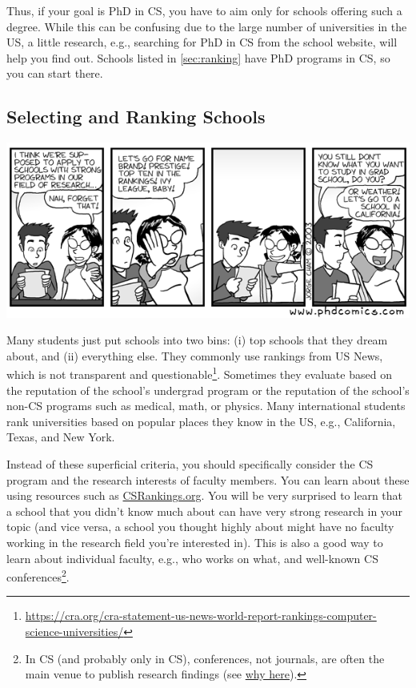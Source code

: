 \documentclass[oneside,11pt,dvipsnames]{book}
\begin{document}
Thus, if your goal is PhD in CS, you have to aim only for schools offering such a degree.  %
While this can be confusing due to the large number of universities in the US, a little research, e.g., searching for PhD in CS from the school website, will help you find out. Schools listed in \autoref{sec:ranking} have PhD programs in CS, so you can start there.


\subsection{Selecting and Ranking Schools}\label{sec:selecting-ranking-schools}
\begin{center}
  \includegraphics[scale=0.5]{files/c1.png}
\end{center}

Many students just put schools into two bins: (i) top schools that they dream about, and (ii) everything else.  They commonly use rankings from US News, which is not transparent and questionable\footnote{\url{https://cra.org/cra-statement-us-news-world-report-rankings-computer-science-universities/}}.  Sometimes they evaluate based on the reputation of the school's undergrad program or the reputation of the school's non-CS programs such as medical, math, or physics.
Many international students rank universities based on popular places they know in the US, e.g., California, Texas, and New York.

Instead of these superficial criteria, you should specifically consider the CS program and the research interests of faculty members.
You can learn about these using resources such as \href{https://csrankings.org}{CSRankings.org}. You will be very surprised to learn that a school that you didn't know much about can have very strong research in your topic (and vice versa, a school you thought highly about might have no faculty working in the research field you're interested in). This is also a good way to learn about individual faculty, e.g., who works on what, and well-known CS conferences\footnote{In CS (and probably only in CS), conferences, not journals, are often the main venue to publish research findings (see \href{https://homes.cs.washington.edu/~mernst/advice/conferences-vs-journals.html}{why here}).}. %
\end{document}
